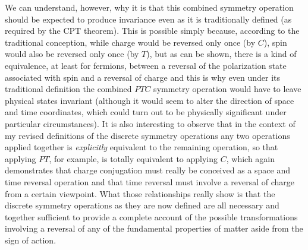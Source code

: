 \documentclass[notitlepage,12pt]{report}
\begin{document}
We can understand, however, why it is that this combined symmetry operation should be expected to produce invariance even as it is traditionally defined (as required by the CPT theorem). This is possible simply because, according to the traditional conception, while charge would be reversed only once (by $C$), spin would also be reversed only once (by $T$), but as can be shown, there is a kind of equivalence, at least for fermions, between a reversal of the polarization state associated with spin and a reversal of charge and this is why even under its traditional definition the combined $PTC$ symmetry operation would have to leave physical states invariant (although it would seem to alter the direction of space and time coordinates, which could turn out to be physically significant under particular circumstances). It is also interesting to observe that in the context of my revised definitions of the discrete symmetry operations any two operations applied together is \textit{explicitly} equivalent to the remaining operation, so that applying $PT$, for example, is totally equivalent to applying $C$, which again demonstrates that charge conjugation must really be conceived as a space and time reversal operation and that time reversal must involve a reversal of charge from a certain viewpoint. What those relationships really show is that the discrete symmetry operations as they are now defined are all necessary and together sufficient to provide a complete account of the possible transformations involving a reversal of any of the fundamental properties of matter aside from the sign of action.
\end{document}
